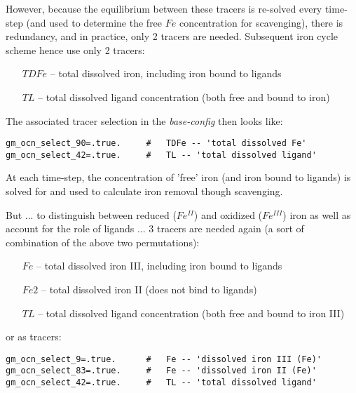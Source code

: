 However, because the equilibrium between these tracers is re-solved every time-step (and used to determine the free \(Fe\) concentration for scavenging), there is redundancy, and in practice, only 2 tracers are needed. Subsequent iron cycle scheme hence use only 2 tracers:
\vspace{1mm}
\begin{itemize}[noitemsep]
\item [\(TDFe\)] -- total dissolved iron, including iron bound to ligands
\item [\(TL\)] -- total dissolved ligand concentration (both free and bound to iron)
\end{itemize}
\vspace{2mm}

The associated tracer selection in the \textit{base-config} then looks like:
\small\vspace{-2pt}\begin{verbatim}
gm_ocn_select_90=.true.     #   TDFe -- 'total dissolved Fe'
gm_ocn_select_42=.true.     #   TL -- 'total dissolved ligand'
\end{verbatim}\vspace{-2pt}\normalsize

At each time-step, the concentration of 'free' iron (and iron bound to ligands) is solved for and used to calculate iron removal though scavenging.

But ... to distinguish between reduced (\(Fe^{II}\)) and oxidized (\(Fe^{III}\)) iron as well as account for the role of ligands ... 3 tracers are needed again (a sort of combination of the above two permutations):
\vspace{1mm}
\begin{itemize}[noitemsep]
\item [\(Fe\)] -- total dissolved iron III, including iron bound to ligands
\item [\(Fe2\)] -- total dissolved iron II (does not bind to ligands)
\item [\(TL\)] --  total dissolved ligand concentration (both free and bound to iron III)
\end{itemize} 
\vspace{2mm}
or as tracers:
\small\vspace{-2pt}\begin{verbatim}
gm_ocn_select_9=.true.      #   Fe -- 'dissolved iron III (Fe)'
gm_ocn_select_83=.true.     #   Fe -- 'dissolved iron II (Fe)'
gm_ocn_select_42=.true.     #   TL -- 'total dissolved ligand' 
\end{verbatim}\vspace{-2pt}\normalsize

